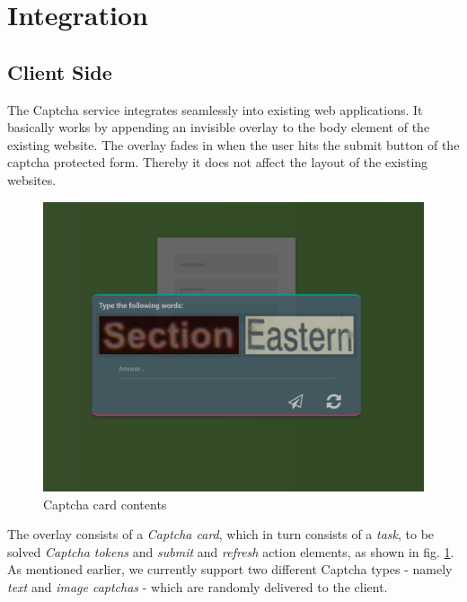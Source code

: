 \section{Integration}
\label{sec:integration}

\subsection{Client Side}
\label{subsec:Client Side}
The Captcha service integrates seamlessly into existing web applications. It basically works by appending an invisible overlay to the body element of the existing website. The overlay fades in when the user hits the submit button of the captcha protected form. Thereby it does not affect the layout of the existing websites.
\begin{figure}[H]
	\centering
	\includegraphics[width=0.8\linewidth]{content/figures/captcha_words.png}
	\caption{Captcha card contents}
	\label{fig:captcha_words}
\end{figure}

 The overlay consists of a \textit{Captcha card}, which in turn consists of a \textit{task}, to be solved \textit{Captcha tokens} and \textit{submit} and \textit{refresh} action elements, as shown in fig. \ref{fig:captcha_words}. As mentioned earlier, we currently support two different Captcha types - namely \textit{text} and \textit{image captchas} - which are randomly delivered to the client. 
 
